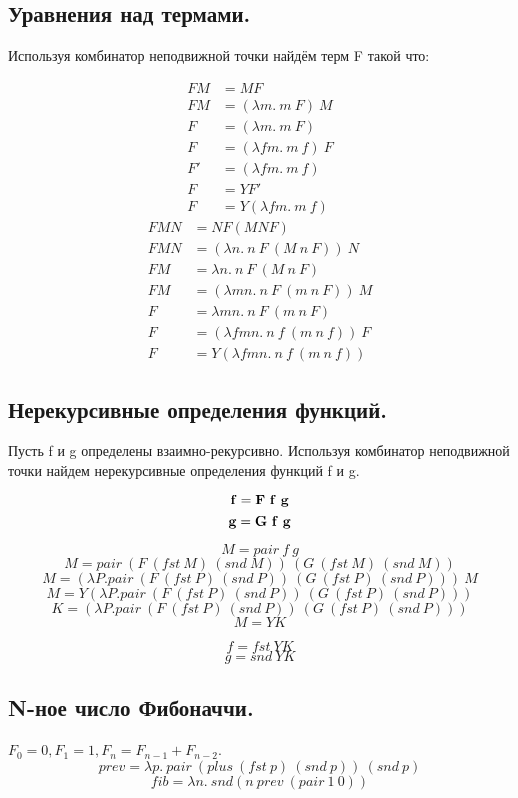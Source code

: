 \documentclass[a4paper,12pt]{article}
\theoremstyle{plain} %
\theoremstyle{definition} %
\theoremstyle{remark} %
\begin{document}
\subsection{Уравнения над термами.}
Используя комбинатор неподвижной точки найдём терм F такой что:

\begin{align*} 
FM &= MF \\
FM &= (\lambda m. \ m \ F) \ M \\ 
F  &= (\lambda m. \ m \ F) \\ 
F  &= (\lambda fm. \ m \ f) \ F \\
F' &= (\lambda fm. \ m \ f) \\
F  &= YF' \\
F  &= Y(\lambda f m. \ m \ f) 
\end{align*}
\begin{align*} 
FMN &= NF(MNF) \\
FMN &= (\lambda n. \ n \ F \ (M \ n \ F)) \ N \\
FM  &= \lambda n. \ n \ F \ (M \ n \ F) \\
FM  &= (\lambda m n. \ n \ F \ (m \ n \ F)) \ M \\
F   &= \lambda m n. \ n \ F \ (m \ n \ F) \\
F   &= (\lambda f m n. \ n \ f \ (m \ n \ f)) \ F \\
F   &= Y(\lambda f m n. \ n \ f \ (m \ n \ f)) 
\end{align*}
\subsection{Нерекурсивные определения функций.}
Пусть f и g определены взаимно-рекурсивно. Используя комбинатор неподвижной точки найдем нерекурсивные определения функций f и g.

$$\bold{f = F \ f \ g}$$
$$\bold{g = G \ f \ g}$$

$$M = pair \ f \ g$$
$$M = pair \ (F \ (fst \ M) \ (snd \ M)) \ (G \ (fst \ M) \ (snd \ M))$$
$$M = (\lambda P. pair \ (F \ (fst \ P) \ (snd \ P)) \ (G \ (fst \ P) \ (snd \ P))) \ M$$
$$M = Y(\lambda P. pair \ (F \ (fst \ P) \ (snd \ P)) \ (G \ (fst \ P) \ (snd \ P)))$$
$$K = (\lambda P. pair \ (F \ (fst \ P) \ (snd \ P)) \ (G \ (fst \ P) \ (snd \ P)))$$
$$M = YK$$

$$f = fst \ YK$$
$$g = snd \ YK$$


\subsection{N-ное число Фибоначчи.}
$F_0 = 0, F_1 = 1, F_n = F_{n - 1} + F_{n - 2}$.
$$prev = \lambda p. \ pair \ (plus \ (fst \ p) \ (snd \ p)) \ (snd \ p)$$
$$fib = \lambda n. \ snd (n \ prev \ (pair \ 1 \ 0))$$
\end{document}
